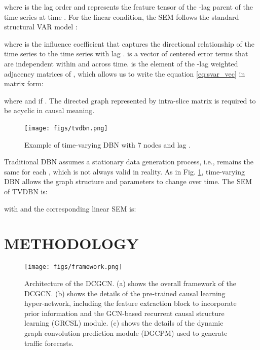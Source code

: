 \documentclass[letterpaper, 10 pt, conference]{ieeeconf}
\begin{document}
where  is the lag order and  represents the feature tensor of the -lag parent of the time series  at time . For the linear condition, the SEM follows the standard structural VAR model \cite{kilian2013structural}:

where  is the influence coefficient that captures the directional relationship of the time series  to the time series  with lag .  is a vector of centered error terms that are independent within and across time.  is the element of the -lag weighted adjacency matrices of , which allows us to write the equation \eqref{eq:svar_vec} in matrix form:

where  and  if . 
The directed graph represented by intra-slice matrix  is required to be acyclic in causal meaning.

\begin{figure}[t]
        \centering
        \texttt{[image: figs/tvdbn.png]}\
        \caption{Example of time-varying DBN with 7 nodes and lag .}
        \label{fig:tvdbn}
\end{figure}

Traditional DBN assumes a stationary data generation process, i.e.,  remains the same for each , which is not always valid in reality. As in Fig. \ref{fig:tvdbn}, time-varying DBN allows the graph structure and parameters to change over time. The SEM of TVDBN is:

with  and the corresponding linear SEM is:


\section{METHODOLOGY}
\begin{figure*}[thbp]
        \centering
        \texttt{[image: figs/framework.png]}
        \vspace{-10pt}
        \caption{Architecture of the DCGCN. (a) shows the overall framework of the DCGCN. (b) shows the details of the pre-trained causal learning hyper-network, including the feature extraction block to incorporate prior information and the GCN-based recurrent causal structure learning (GRCSL) module. (c) shows the details of the dynamic graph convolution prediction module (DGCPM) used to generate traffic forecasts. }
        \label{fig:framework}
\end{figure*}
\end{document}
